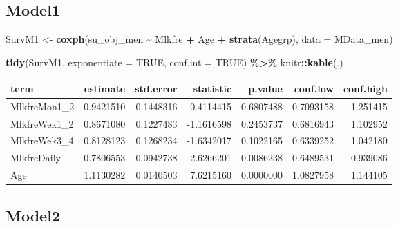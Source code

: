 \documentclass[
]{article}
\newenvironment{Shaded}{\begin{snugshade}}{\end{snugshade}}
\newcommand{\DataTypeTok}[1]{\textcolor[rgb]{0.13,0.29,0.53}{#1}}
\newcommand{\KeywordTok}[1]{\textcolor[rgb]{0.13,0.29,0.53}{\textbf{#1}}}
\newcommand{\NormalTok}[1]{#1}
\newcommand{\OperatorTok}[1]{\textcolor[rgb]{0.81,0.36,0.00}{\textbf{#1}}}
\newcommand{\OtherTok}[1]{\textcolor[rgb]{0.56,0.35,0.01}{#1}}
\newcommand{\StringTok}[1]{\textcolor[rgb]{0.31,0.60,0.02}{#1}}
\begin{document}
\hypertarget{model1-7}{%
\subsection{Model1}\label{model1-7}}

\begin{Shaded}
\begin{Highlighting}[]
\NormalTok{SurvM1 \textless{}{-}}\StringTok{  }\KeywordTok{coxph}\NormalTok{(su\_obj\_men }\OperatorTok{\textasciitilde{}}\StringTok{ }\NormalTok{Mlkfre }\OperatorTok{+}\StringTok{ }\NormalTok{Age }\OperatorTok{+}\StringTok{ }\KeywordTok{strata}\NormalTok{(Agegrp), }
                 \DataTypeTok{data =}\NormalTok{ MData\_men)}

\KeywordTok{tidy}\NormalTok{(SurvM1, }\DataTypeTok{exponentiate =} \OtherTok{TRUE}\NormalTok{, }\DataTypeTok{conf.int =} \OtherTok{TRUE}\NormalTok{) }\OperatorTok{\%\textgreater{}\%}\StringTok{ }
\StringTok{  }\NormalTok{knitr}\OperatorTok{::}\KeywordTok{kable}\NormalTok{(.)}
\end{Highlighting}
\end{Shaded}

\begin{longtable}[]{@{}lrrrrrr@{}}
\toprule
term & estimate & std.error & statistic & p.value & conf.low &
conf.high\tabularnewline
\midrule
\endhead
MlkfreMon1\_2 & 0.9421510 & 0.1448316 & -0.4114415 & 0.6807488 &
0.7093158 & 1.251415\tabularnewline
MlkfreWek1\_2 & 0.8671080 & 0.1227483 & -1.1616598 & 0.2453737 &
0.6816943 & 1.102952\tabularnewline
MlkfreWek3\_4 & 0.8128123 & 0.1268234 & -1.6342017 & 0.1022165 &
0.6339252 & 1.042180\tabularnewline
MlkfreDaily & 0.7806553 & 0.0942738 & -2.6266201 & 0.0086238 & 0.6489531
& 0.939086\tabularnewline
Age & 1.1130282 & 0.0140503 & 7.6215160 & 0.0000000 & 1.0827958 &
1.144105\tabularnewline
\bottomrule
\end{longtable}

\hypertarget{model2-7}{%
\subsection{Model2}\label{model2-7}}
\end{document}
